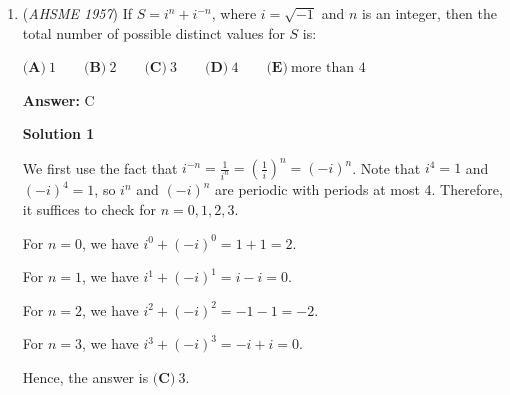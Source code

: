 \begin{enumerate}
Notice that the two equations are lines in \href{https://artofproblemsolving.com/wiki/index.php?title=Standard\_form}{standard form}, so the system will have no solutions if these lines never intersect. For them never to intersect, they must have the same slope and not be the exact same line. We are sure that they are not the same line, because they have different coefficients and have the same number, $1$, on their right hand sides. In the case that one of the lines has an undefined slope (where it is of the form $x=k$, where $k$ is some constant), then $a$ is either $1$ or $0$. In either case, the other line does not have an undefined slope, so the lines eventually intersect and there must be a solution to the system of equations. Thus, we need not worry about this case. Because the lines are in standard form, we can equate the two expressions for their slope as follows:\begin{align*}-\frac{a-1}{a} &= - \frac{-a}{a+1} \\-(a^2-1) &= a^2 \\2a^2 &= 1 \\a^2 &= \frac 1 2 \\a &= \pm \frac 1{\sqrt2} = \pm \frac{\sqrt2}2\end{align*}
Thus, our answer is $\boxed{\textbf{(D) }\frac{\pm \sqrt2}2}$.

 


	\item (\textit{AHSME 1957}) If $S = i^n + i^{-n}$, where $i = \sqrt{-1}$ and $n$ is an integer, then the total number of possible distinct values for $S$ is: 


 $\textbf{(A)}\ 1\qquad \textbf{(B)}\ 2\qquad \textbf{(C)}\ 3\qquad \textbf{(D)}\ 4\qquad \textbf{(E)}\ \text{more than 4}$

 \textbf{Answer: }C



\textbf{Solution 1}

We first use the fact that $i^{-n}=\frac1{i^n}=\left(\frac1i\right)^n=(-i)^n$. Note that $i^4=1$ and $(-i)^4=1$, so $i^n$ and $(-i)^n$ are periodic with periods at most 4. Therefore, it suffices to check for $n=0,1,2,3$.

 
For $n=0$, we have $i^0+(-i)^0=1+1=2$.

 For $n=1$, we have $i^1+(-i)^1=i-i=0$.

 For $n=2$, we have $i^2+(-i)^2=-1-1=-2$.

 For $n=3$, we have $i^3+(-i)^3=-i+i=0$.

 Hence, the answer is $\boxed{\textbf{(C)}\ 3}$.


\end{enumerate}
